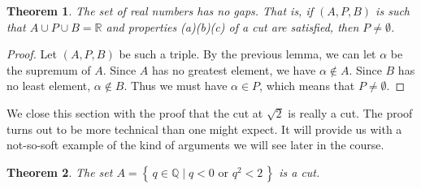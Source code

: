 \documentclass[11pt,oneside]{amsbook}
\newcommand{\set}[1]{\left\{\,#1\,\right\}}
\newcommand{\Q}{\mathbb Q}
\newcommand{\R}{\mathbb R}
\theoremstyle{definition}
\theoremstyle{plain}
\newtheorem{theorem}{Theorem}[section]
\theoremstyle{definition}
\theoremstyle{remark}
\numberwithin{equation}{section}
\numberwithin{figure}{section}
\begin{document}
\begin{theorem}
  The set of real numbers has no gaps. That is, if $(A,P,B)$ is such that $A\cup P\cup B=\R$ and properties (a)(b)(c) of a cut are satisfied, then $P\neq\emptyset$.
\end{theorem}

\begin{proof}
  Let $(A,P,B)$ be such a triple. By the previous lemma, we can let $\alpha$ be the supremum of $A$. Since $A$ has no greatest element, we have $\alpha\notin A$. Since $B$ has no least element, $\alpha\notin B$. Thus we must have $\alpha\in P$, which means that $P\neq\emptyset$.
\end{proof}



We close this section with the proof that the cut at $\sqrt2$ is really a cut. The proof turns out to be more technical than one might expect. It will provide us with a not-so-soft example of the kind of arguments we will see later in the course.

\begin{theorem}
  \label{thm:root-2-cut}
  The set $A=\set{q\in\Q\mid q<0\text{ or }q^2<2}$ is a cut.
\end{theorem}
\end{document}
